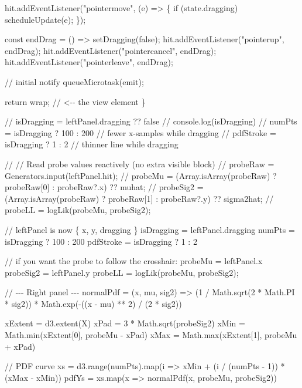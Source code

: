 \documentclass[
  letterpaper,
  DIV=11,
  numbers=noendperiod]{scrreprt}
\newenvironment{Shaded}{\begin{snugshade}}{\end{snugshade}}
\newcommand{\NormalTok}[1]{\textcolor[rgb]{0.00,0.23,0.31}{#1}}
\theoremstyle{definition}
\theoremstyle{plain}
\theoremstyle{definition}
\theoremstyle{remark}
\begin{document}
\begin{Shaded}
\begin{Highlighting}[]
\NormalTok{  hit.addEventListener("pointermove", (e) =\textgreater{} \{}
\NormalTok{    if (state.dragging) scheduleUpdate(e);}
\NormalTok{  \});}

\NormalTok{  const endDrag = () =\textgreater{} setDragging(false);}
\NormalTok{  hit.addEventListener("pointerup", endDrag);}
\NormalTok{  hit.addEventListener("pointercancel", endDrag);}
\NormalTok{  hit.addEventListener("pointerleave", endDrag);}

\NormalTok{  // initial notify}
\NormalTok{  queueMicrotask(emit);}

\NormalTok{  return wrap;                           // \textless{}{-}{-} the view element}
\NormalTok{\}}


\NormalTok{// isDragging = leftPanel.dragging ?? false}
\NormalTok{// console.log(isDragging)}
\NormalTok{// numPts = isDragging ? 100 : 200   // fewer x{-}samples while dragging}
\NormalTok{// pdfStroke = isDragging ? 1 : 2   // thinner line while dragging}


\NormalTok{// // Read probe values reactively (no extra visible block)}
\NormalTok{// probeRaw = Generators.input(leftPanel.hit);}
\NormalTok{// probeMu = (Array.isArray(probeRaw) ? probeRaw[0] : probeRaw?.x) ?? muhat;}
\NormalTok{// probeSig2 = (Array.isArray(probeRaw) ? probeRaw[1] : probeRaw?.y) ?? sigma2hat;}
\NormalTok{// probeLL = logLik(probeMu, probeSig2);}


\NormalTok{// leftPanel is now \{ x, y, dragging \}}
\NormalTok{isDragging = leftPanel.dragging}
\NormalTok{numPts     = isDragging ? 100 : 200}
\NormalTok{pdfStroke  = isDragging ? 1   : 2}

\NormalTok{// if you want the probe to follow the crosshair:}
\NormalTok{probeMu   = leftPanel.x}
\NormalTok{probeSig2 = leftPanel.y}
\NormalTok{probeLL = logLik(probeMu, probeSig2);}


\NormalTok{// {-}{-}{-} Right panel {-}{-}{-}}
\NormalTok{normalPdf = (x, mu, sig2) =\textgreater{} (1 / Math.sqrt(2 * Math.PI * sig2)) * Math.exp({-}((x {-} mu) ** 2) / (2 * sig2))}

\NormalTok{xExtent = d3.extent(X)}
\NormalTok{xPad = 3 * Math.sqrt(probeSig2)}
\NormalTok{xMin = Math.min(xExtent[0], probeMu {-} xPad)}
\NormalTok{xMax = Math.max(xExtent[1], probeMu + xPad)}

\NormalTok{// PDF curve}
\NormalTok{xs = d3.range(numPts).map(i =\textgreater{} xMin + (i / (numPts {-} 1)) * (xMax {-} xMin))}
\NormalTok{pdfYs = xs.map(x =\textgreater{} normalPdf(x, probeMu, probeSig2))}


\end{Highlighting}
\end{Shaded}
\end{document}
